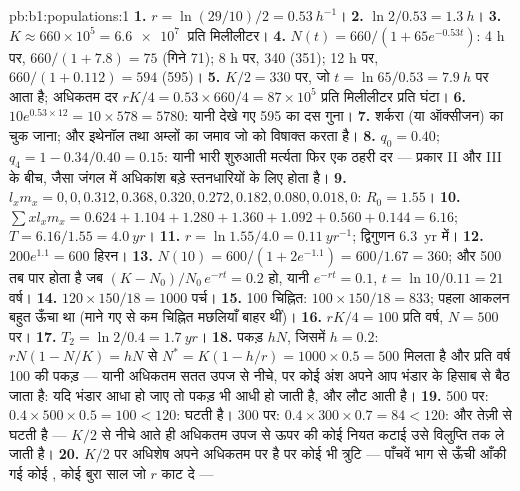 \begin{solution}{pb:b1:populations:1}
\textbf{1.} $r = \ln(29/10)/2 = \qty{0.53}{h^{-1}}$।
\textbf{2.} $\ln 2/0.53 = \qty{1.3}{h}$।
\textbf{3.} $K \approx 660\times 10^5 = \qty{6.6e7}{}$  प्रति
मिलीलीटर।
\textbf{4.} $N(t) = 660/(1 + 65e^{-0.53t})$: 4 h पर, $660/(1 + 7.8) =
75$ (गिने 71); 8 h पर, 340 (351); 12 h पर, $660/(1 + 0.112) = 594$
(595)।
\textbf{5.} $K/2 = 330$ पर, जो $t = \ln 65/0.53 = \qty{7.9}{h}$ पर आता है;
अधिकतम दर $rK/4 = 0.53\times 660/4 = 87\times 10^5$  प्रति
मिलीलीटर प्रति घंटा।
\textbf{6.} $10e^{0.53\times 12} = 10\times 578 = 5780$: यानी देखे गए
595 का दस गुना।
\textbf{7.} शर्करा (या ऑक्सीजन) का चुक जाना; और इथेनॉल तथा अम्लों का
जमाव जो  को विषाक्त करता है।
\textbf{8.} $q_0 = 0.40$; $q_4 = 1 - 0.34/0.40 = 0.15$: यानी भारी शुरुआती
मर्त्यता फिर एक ठहरी दर --- प्रकार II और III के बीच, जैसा जंगल में
अधिकांश बड़े स्तनधारियों के लिए होता है।
\textbf{9.} $l_x m_x = 0, 0, 0.312, 0.368, 0.320, 0.272, 0.182, 0.080,
0.018, 0$: $R_0 = 1.55$।
\textbf{10.} $\sum x l_x m_x = 0.624 + 1.104 + 1.280 + 1.360 + 1.092 +
0.560 + 0.144 = 6.16$; $T = 6.16/1.55 = \qty{4.0}{yr}$।
\textbf{11.} $r = \ln 1.55/4.0 = \qty{0.11}{yr^{-1}}$; द्विगुणन
\qty{6.3}{yr} में।
\textbf{12.} $200e^{1.1} = 600$ हिरन।
\textbf{13.} $N(10) = 600/(1 + 2e^{-1.1}) = 600/1.67 = 360$; और 500 तब
पार होता है जब $(K - N_0)/N_0\,e^{-rt} = 0.2$ हो, यानी $e^{-rt} = 0.1$, $t = \ln
10/0.11 = 21$ वर्ष।
\textbf{14.} $120\times 150/18 = 1000$ पर्च।
\textbf{15.} 100 चिह्नित: $100\times 150/18 = 833$; पहला आकलन
बहुत ऊँचा था (माने गए से कम चिह्नित मछलियाँ बाहर थीं)।
\textbf{16.} $rK/4 = 100$ प्रति वर्ष, $N = 500$ पर।
\textbf{17.} $T_2 = \ln 2/0.4 = \qty{1.7}{yr}$।
\textbf{18.} पकड़ $hN$, जिसमें $h = 0.2$: $rN(1 - N/K) = hN$ से $N^* =
K(1 - h/r) = 1000\times 0.5 = 500$ मिलता है और प्रति वर्ष \num{100} की
पकड़ --- यानी अधिकतम सतत उपज से नीचे, पर कोई अंश अपने आप भंडार के हिसाब
से बैठ जाता है: यदि भंडार आधा हो जाए तो पकड़ भी आधी हो जाती है, और 
लौट आती है।
\textbf{19.} 500 पर: $0.4\times 500\times 0.5 = 100 < 120$: 
घटती है। 300 पर: $0.4\times 300\times 0.7 = 84 < 120$: और तेज़ी से
घटती है --- $K/2$ से नीचे आते ही अधिकतम उपज से ऊपर की कोई नियत कटाई
उसे विलुप्ति तक ले जाती है।
\textbf{20.} $K/2$ पर अधिशेष अपने अधिकतम पर है पर कोई भी त्रुटि ---
पाँचवें भाग से ऊँची आँकी गई कोई , कोई बुरा साल जो $r$ काट दे ---

\end{solution}
